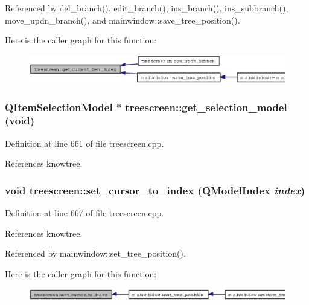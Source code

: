 Referenced by del\_\-branch(), edit\_\-branch(), ins\_\-branch(), ins\_\-subbranch(), move\_\-updn\_\-branch(), and mainwindow::save\_\-tree\_\-position().

Here is the caller graph for this function:\begin{figure}[H]
\begin{center}
\leavevmode
\includegraphics[width=327pt]{classtreescreen_8b56108409028dc2c0996ac573fa7ff9_icgraph}
\end{center}
\end{figure}
\subsubsection{\setlength{\rightskip}{0pt plus 5cm}QItem\-Selection\-Model $\ast$ treescreen::get\_\-selection\_\-model (void)}\label{classtreescreen_4319d9040f7721bd11f6defed0c3fbac}




Definition at line 661 of file treescreen.cpp.

References knowtree.
\subsubsection{\setlength{\rightskip}{0pt plus 5cm}void treescreen::set\_\-cursor\_\-to\_\-index (QModel\-Index {\em index})}\label{classtreescreen_c492316dfc6b272f474b267761962368}




Definition at line 667 of file treescreen.cpp.

References knowtree.

Referenced by mainwindow::set\_\-tree\_\-position().

Here is the caller graph for this function:\begin{figure}[H]
\begin{center}
\leavevmode
\includegraphics[width=370pt]{classtreescreen_c492316dfc6b272f474b267761962368_icgraph}
\end{center}
\end{figure}

